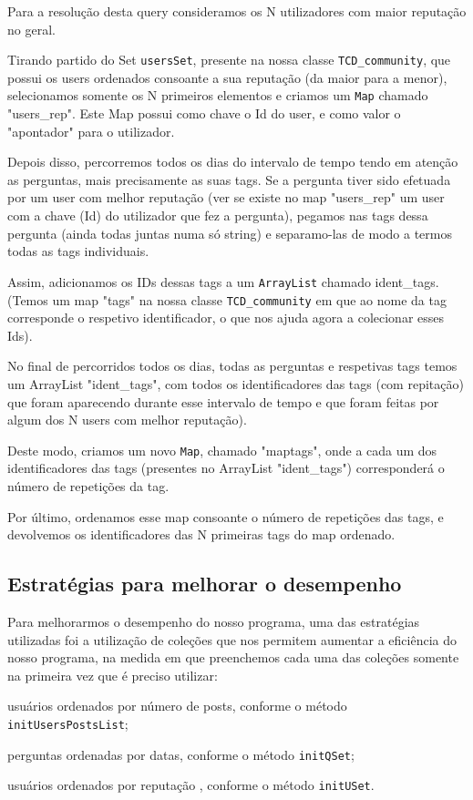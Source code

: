 \documentclass[a4paper]{article}
\begin{document}
Para a resolução desta query consideramos os N utilizadores com maior reputação no geral.

Tirando partido do Set \texttt{usersSet}, presente na nossa classe
\texttt{TCD\_community},
que possui os users ordenados consoante a sua reputação (da maior
para a menor), selecionamos somente os N primeiros elementos e
criamos um \texttt{Map} chamado "users\_rep". Este Map possui como
chave o Id do user, e como valor o "apontador" para o utilizador.

Depois disso, percorremos todos os dias do intervalo
de tempo tendo em atenção as perguntas, mais precisamente as suas tags.
Se a pergunta tiver sido efetuada por um user com melhor reputação (ver se existe
no map "users\_rep" um user com a chave (Id) do utilizador que fez a pergunta),
pegamos nas tags dessa pergunta (ainda todas juntas numa só string) e separamo-las
de modo a termos todas as tags individuais.

Assim, adicionamos os IDs dessas tags a um \texttt{ArrayList} chamado ident\_tags.
(Temos um map "tags" na nossa classe \texttt{TCD\_community} em que ao nome da tag
corresponde o respetivo identificador, o que nos ajuda agora a colecionar esses
Ids).

No final de percorridos todos os dias, todas as perguntas e respetivas tags
temos um ArrayList "ident\_tags", com todos os identificadores das tags
(com repitação) que foram aparecendo durante
esse intervalo de tempo e que foram feitas por algum dos N users com melhor reputação).

Deste modo, criamos um novo \texttt{Map}, chamado "maptags", onde a cada um dos
identificadores das tags (presentes no ArrayList "ident\_tags") corresponderá o
número de repetições da tag.

Por último, ordenamos esse map consoante o número de repetições das tags, e
devolvemos os identificadores das N primeiras tags do map ordenado.



\subsection{Estratégias para melhorar o desempenho}
\label{sec:desempenho}

Para melhorarmos o desempenho do nosso programa, uma das estratégias utilizadas foi
a utilização de coleções que nos permitem aumentar a eficiência do nosso programa, na
medida em que preenchemos cada uma das coleções somente na primeira vez que é preciso
utilizar:
\begin{itemize}
\begin{item} usuários ordenados por número de posts, conforme o método \texttt{initUsersPostsList};\end{item}
\begin{item} perguntas ordenadas por datas, conforme o método \texttt{initQSet};\end{item}
\begin{item} usuários ordenados por reputação , conforme o método \texttt{initUSet}.\end{item}
\end{itemize}
\end{document}
